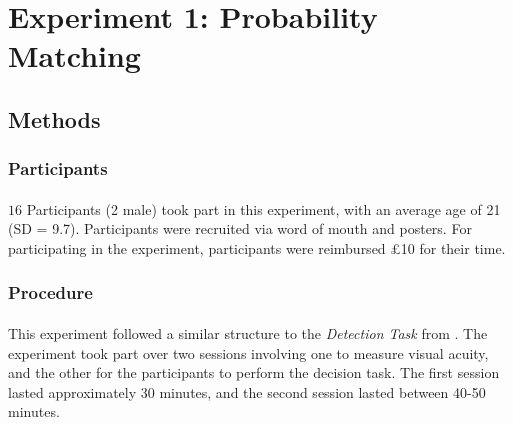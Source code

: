 \documentclass[12pt]{article}
\begin{document}


\section*{Experiment 1: Probability Matching}

\subsection*{Methods}
\subsubsection*{Participants}
\paragraph{} $16$ Participants (2 male) took part in this experiment, with an average age of 21 (SD = 9.7). Participants were recruited via word of mouth and posters. For participating in the experiment, participants were reimbursed \pounds10 for their time. 

\subsubsection*{Procedure}
\paragraph{} This experiment followed a similar structure to the \textit{Detection Task} from \cite{clarke2015failure}. The experiment took part over two sessions involving one to measure visual acuity, and the other for the participants to perform the decision task. The first session lasted approximately 30 minutes, and the second session lasted between 40-50 minutes.
\end{document}
